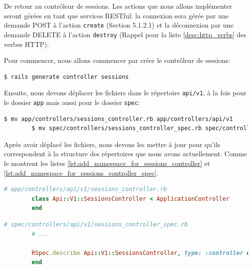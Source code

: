 \documentclass[]{report}
\begin{document}
      De retour au contrôleur de sessions. Les actions que nous allons implémenter seront gérées en tant que services RESTful: la connexion sera gérée par une demande POST à l'action \verb|create| (Section 5.1.2.1) et la déconnexion par une demande DELETE à l'action \verb|destroy| (Rappel pour la liste \ref{desc:http_verbs} des verbes HTTP).

      Pour commencer, nous allons commencer par créer le contrôleur de sessions:

      \begin{scriptsize}
        \begin{lstlisting}[language=bash]
        $ rails generate controller sessions
        \end{lstlisting}
      \end{scriptsize}

      Ensuite, nous devons déplacer les fichiers dans le répertoire \verb|api/v1|, à la fois pour le dossier \verb|app| mais aussi pour le dossier \verb|spec|:

      \begin{scriptsize}
        \begin{lstlisting}[language=bash]
        $ mv app/controllers/sessions_controller.rb app/controllers/api/v1
        $ mv spec/controllers/sessions_controller_spec.rb spec/controllers/api/v1
        \end{lstlisting}
      \end{scriptsize}

      Après avoir déplacé les fichiers, nous devons les mettre à jour pour qu'ils correspondent à la structure des répertoires que nous avons actuellement. Comme le montrent les listes \ref{lst:add_namespace_for_sessions_controller} et \ref{lst:add_namespace_for_sessions_controller_spec}.

      \begin{scriptsize}
        \begin{lstlisting}[language=ruby, caption={Ajout des Namespaces pour le contrôlleur de sessions}, label={lst:add_namespace_for_sessions_controller}]
        # app/controllers/api/v1/sessions_controller.rb
        class Api::V1::SessionsController < ApplicationController
        end
        \end{lstlisting}
      \end{scriptsize}

      \begin{scriptsize}
        \begin{lstlisting}[language=ruby, caption={Ajout des Namespaces pour le test du contrôlleur de sessions}, label={lst:add_namespace_for_sessions_controller_spec}]
        # spec/controllers/api/v1/sessions_controller_spec.rb
        # ...

        RSpec.describe Api::V1::SessionsController, type: :controller do
        end
        \end{lstlisting}
      \end{scriptsize}
\end{document}
